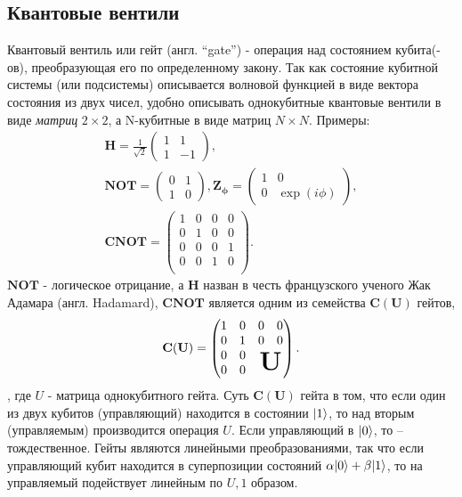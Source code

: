 \documentclass[12pt, twoside]{report}
\DeclarePairedDelimiter\ket{\lvert}{\rangle}
\numberwithin{equation}{section}
\numberwithin{figure}{section}
\begin{document}
\subsection{Квантовые вентили}
Квантовый вентиль или гейт (англ. ``gate'') - операция над состоянием кубита(-ов), преобразующая его по определенному закону. \newline
Так как состояние кубитной системы (или подсистемы) описывается волновой функцией в виде вектора состояния из двух чисел, удобно описывать однокубитные квантовые вентили в виде \textit{матриц} $2 \times 2$, а N-кубитные в виде матриц $N \times N$. Примеры:
\begin{gather}
\mathbf{H} = \frac{1}{\sqrt{2}}
\begin{pmatrix}
1 & 1 \\
1 & -1
\end{pmatrix}, \\
\mathbf{NOT} = 
\begin{pmatrix}
0 & 1 \\
1 & 0
\end{pmatrix}, 
\mathbf{Z_\phi} = 
\begin{pmatrix}
1 & 0 \\
0 & \exp \left( i \phi \right)
\end{pmatrix}, \\
\mathbf{CNOT} = 
\begin{pmatrix}
1 & 0 & 0 & 0 \\
0 & 1 & 0 & 0 \\
0 & 0 & 0 & 1 \\
0 & 0 & 1 & 0 \\
\end{pmatrix}.
\end{gather}
$\mathbf{NOT}$ - логическое отрицание, а $\mathbf{H}$ назван в честь французского ученого Жак Адамара (англ. Hadamard), 
$\mathbf{CNOT}$ является одним из семейства $\mathbf{C(U)}$ гейтов,
\begin{gather}
\mathbf{C ( U )} = 
\begin{pmatrix}
1 & 0 & 0 & 0 \\
0 & 1 & 0 & 0 \\
0 & 0 & \multicolumn{2}{c}{\multirow{2}{*}{\text{\huge \textbf{U}}}} \\
0 & 0 & \\
\end{pmatrix}.
\end{gather}
, где $U$ - матрица однокубитного гейта. Суть $\mathbf{C(U)}$ гейта в том, что если один из двух кубитов (управляющий) находится в состоянии $\ket{1}$, то над вторым (управляемым) производится операция $U$. Если управляющий в $\ket{0}$, то -- тождественное. Гейты являются линейными преобразованиями, так что если управляющий кубит находится в суперпозиции состояний $\alpha \ket{0} + \beta \ket{1}$, то на управляемый подействует линейным по $U, \mathcal{1}$ образом.
\end{document}
